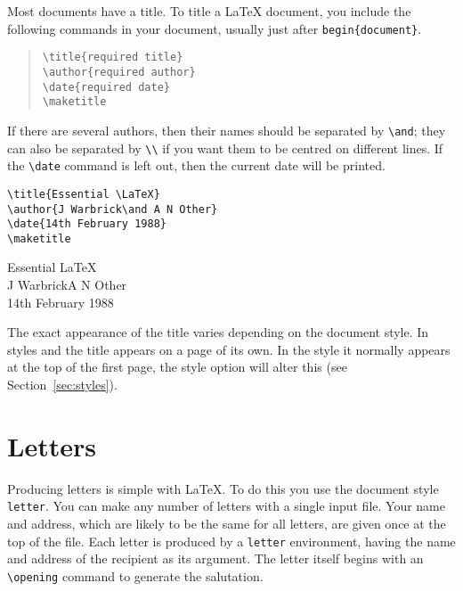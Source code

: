 Most documents have a title.  To title a \LaTeX{} document, you include the
following commands in your document, usually just after
\verb|begin{document}|.
\begin{quote}\footnotesize\begin{verbatim}
\title{required title}
\author{required author}
\date{required date}
\maketitle
\end{verbatim}\end{quote}
If there are several authors, then their names should be separated by
\verb|\and|; they can also be separated by \verb|\\| if you want them to be
centred on different lines.  If the \verb|\date| command is left out, then the
current date will be printed.
\egstart
\begin{verbatim}
\title{Essential \LaTeX}
\author{J Warbrick\and A N Other}
\date{14th February 1988}
\maketitle
\end{verbatim}
\egmid
\begin{center}
{\normalsize Essential \LaTeX}\\[4ex]
J Warbrick\hspace{1em}A N Other\\[2ex]
14th February 1988
\end{center}
\egend

The exact appearance of the title varies depending on
the document style.  In styles  and  the title appears on a
page of its own. In the  style it normally appears at the top
of the first page, the style option  will alter this (see
Section~\ref{sec:styles}).

\section{Letters}

Producing letters is simple with \LaTeX{}. To do this you use the document
style {\tt letter}. You can make any number of
letters with a single input file.
Your name and address, which are likely to be
the same for all letters, are given once at the top of the file.  Each letter
is produced by a {\tt letter} environment, having the name and address of the
recipient as its argument.  The letter itself begins with an \verb|\opening|
command to generate the salutation.

